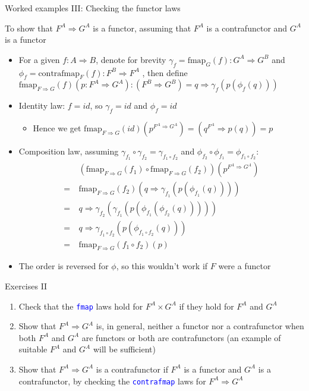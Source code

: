 \documentclass[english]{beamer}
\begin{document}
\begin{frame}{Worked examples III: Checking the functor laws}

To show that $F^{A}\Rightarrow G^{A}$ is a functor, assuming that
$F^{A}$ is a contrafunctor and $G^{A}$ is a functor
\begin{itemize}
\item For a given $f:A\Rightarrow B$, denote for brevity $\gamma_{f}=\text{fmap}_{G}(f):G^{A}\Rightarrow G^{B}$
and $\phi_{f}=\text{contrafmap}_{F}(f):F^{B}\Rightarrow F^{A}$ ,
then define $\text{fmap}_{F\Rightarrow G}(f)(p:F^{A}\Rightarrow G^{A}):\left(F^{B}\Rightarrow G^{B}\right)=q\Rightarrow\gamma_{f}(p(\phi_{f}(q)))$
\item Identity law: $f=id$, so $\gamma_{f}=id$ and $\phi_{f}=id$
\begin{itemize}
\item Hence we get $\text{fmap}_{F\Rightarrow G}(id)(p^{F^{A}\Rightarrow G^{A}})=\left(q^{F^{A}}\Rightarrow p(q)\right)=p$
\end{itemize}
\item Composition law, assuming $\gamma_{f_{1}}\circ\gamma_{f_{2}}=\gamma_{f_{1}\circ f_{2}}$
and $\phi_{f_{2}}\circ\phi_{f_{1}}=\phi_{f_{1}\circ f_{2}}$: 
\begin{align*}
 & (\text{fmap}_{F\Rightarrow G}(f_{1})\circ\text{fmap}_{F\Rightarrow G}(f_{2}))(p^{F^{A}\Rightarrow G^{A}})\\
=\  & \text{fmap}_{F\Rightarrow G}(f_{2})\left(q\Rightarrow\gamma_{f_{1}}(p(\phi_{f_{1}}(q)))\right)\\
=\  & q\Rightarrow\gamma_{f_{2}}(\gamma_{f_{1}}(p(\phi_{f_{1}}(\phi_{f_{2}}(q)))))\\
=\  & q\Rightarrow\gamma_{f_{1}\circ f_{2}}(p(\phi_{f_{1}\circ f_{2}}(q)))\\
=\  & \text{fmap}_{F\Rightarrow G}(f_{1}\circ f_{2})(p)
\end{align*}
\item The order is reversed for $\phi$, so this wouldn't work if $F$ were
a functor
\end{itemize}
\end{frame}

\begin{frame}{Exercises II}
\begin{enumerate}
\item Check that the \texttt{\textcolor{blue}{\footnotesize{}fmap}} laws
hold for $F^{A}\times G^{A}$ if they hold for $F^{A}$ and $G^{A}$
\item Show that $F^{A}\Rightarrow G^{A}$ is, in general, neither a functor
nor a contrafunctor when both $F^{A}$ and $G^{A}$ are functors or
both are contrafunctors (an example of suitable $F^{A}$ and $G^{A}$
will be sufficient)
\item Show that $F^{A}\Rightarrow G^{A}$ is a contrafunctor if $F^{A}$
is a functor and $G^{A}$ is a contrafunctor, by checking the \texttt{\textcolor{blue}{\footnotesize{}contrafmap}}
laws for $F^{A}\Rightarrow G^{A}$ 
\end{enumerate}
\end{frame}
\end{document}
